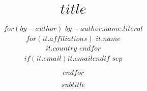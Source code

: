 \title{$title$}

\author{
  $for(by-author)$
    {$by-author.name.literal$} \\
    $for(it.affiliations)$
    $it.name$ \\
    $it.country$
    $endfor$ \\
    $if(it.email)$\href{mailto:$it.email$}{$it.email$}$endif$
    $sep$ \and 
  $endfor$}

\date{$subtitle$}

